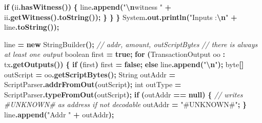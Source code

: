 \documentclass[
  italian,
  openany]{book}
\newenvironment{Shaded}{\begin{snugshade}}{\end{snugshade}}
\newcommand{\BuiltInTok}[1]{#1}
\newcommand{\CommentTok}[1]{\textcolor[rgb]{0.56,0.35,0.01}{\textit{#1}}}
\newcommand{\ControlFlowTok}[1]{\textcolor[rgb]{0.13,0.29,0.53}{\textbf{#1}}}
\newcommand{\DataTypeTok}[1]{\textcolor[rgb]{0.13,0.29,0.53}{#1}}
\newcommand{\FunctionTok}[1]{\textcolor[rgb]{0.13,0.29,0.53}{\textbf{#1}}}
\newcommand{\KeywordTok}[1]{\textcolor[rgb]{0.13,0.29,0.53}{\textbf{#1}}}
\newcommand{\NormalTok}[1]{#1}
\newcommand{\OperatorTok}[1]{\textcolor[rgb]{0.81,0.36,0.00}{\textbf{#1}}}
\newcommand{\SpecialCharTok}[1]{\textcolor[rgb]{0.81,0.36,0.00}{\textbf{#1}}}
\newcommand{\StringTok}[1]{\textcolor[rgb]{0.31,0.60,0.02}{#1}}
\begin{document}
\begin{Shaded}
\begin{Highlighting}[]
            \ControlFlowTok{if} \OperatorTok{(}\NormalTok{ii}\OperatorTok{.}\FunctionTok{hasWitness}\OperatorTok{())} \OperatorTok{\{}
\NormalTok{                line}\OperatorTok{.}\FunctionTok{append}\OperatorTok{(}\StringTok{"}\SpecialCharTok{\textbackslash{}n}\StringTok{witness     "} \OperatorTok{+}\NormalTok{ ii}\OperatorTok{.}\FunctionTok{getWitness}\OperatorTok{().}\FunctionTok{toString}\OperatorTok{());}
            \OperatorTok{\}}
        \OperatorTok{\}}
    \OperatorTok{\}}
    \BuiltInTok{System}\OperatorTok{.}\FunctionTok{out}\OperatorTok{.}\FunctionTok{println}\OperatorTok{(}\StringTok{"Inputs :}\SpecialCharTok{\textbackslash{}n}\StringTok{"} \OperatorTok{+}\NormalTok{ line}\OperatorTok{.}\FunctionTok{toString}\OperatorTok{());}

\NormalTok{    line }\OperatorTok{=} \KeywordTok{new} \BuiltInTok{StringBuilder}\OperatorTok{();}
    \CommentTok{// addr, amount, outScriptBytes}
    \CommentTok{// there is always at least one output}
    \DataTypeTok{boolean}\NormalTok{ first }\OperatorTok{=} \KeywordTok{true}\OperatorTok{;}
    \ControlFlowTok{for} \OperatorTok{(}\NormalTok{TransactionOutput oo }\OperatorTok{:}\NormalTok{ tx}\OperatorTok{.}\FunctionTok{getOutputs}\OperatorTok{())} \OperatorTok{\{}
        \ControlFlowTok{if} \OperatorTok{(}\NormalTok{first}\OperatorTok{)}\NormalTok{ first }\OperatorTok{=} \KeywordTok{false}\OperatorTok{;}
        \ControlFlowTok{else}\NormalTok{ line}\OperatorTok{.}\FunctionTok{append}\OperatorTok{(}\StringTok{"}\SpecialCharTok{\textbackslash{}n}\StringTok{"}\OperatorTok{);}
        \DataTypeTok{byte}\OperatorTok{[]}\NormalTok{ outScript }\OperatorTok{=}\NormalTok{ oo}\OperatorTok{.}\FunctionTok{getScriptBytes}\OperatorTok{();}
        \BuiltInTok{String}\NormalTok{ outAddr }\OperatorTok{=}\NormalTok{ ScriptParser}\OperatorTok{.}\FunctionTok{addrFromOut}\OperatorTok{(}\NormalTok{outScript}\OperatorTok{);}
        \DataTypeTok{int}\NormalTok{ outType }\OperatorTok{=}\NormalTok{ ScriptParser}\OperatorTok{.}\FunctionTok{typeFromOut}\OperatorTok{(}\NormalTok{outScript}\OperatorTok{);}
        \ControlFlowTok{if} \OperatorTok{(}\NormalTok{outAddr }\OperatorTok{==} \KeywordTok{null}\OperatorTok{)} \OperatorTok{\{}
            \CommentTok{// writes \textquotesingle{}\#UNKNOWN\#\textquotesingle{} as address if not decodable}
\NormalTok{            outAddr }\OperatorTok{=} \StringTok{"\#UNKNOWN\#"}\OperatorTok{;}
        \OperatorTok{\}}
\NormalTok{        line}\OperatorTok{.}\FunctionTok{append}\OperatorTok{(}\StringTok{"Addr "} \OperatorTok{+}\NormalTok{ outAddr}\OperatorTok{);}

\end{Highlighting}
\end{Shaded}
\end{document}
